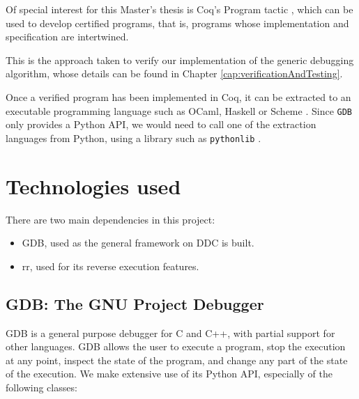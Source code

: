 Of special interest for this Master's thesis is Coq's Program tactic \cite{Program_coq}, which can be used to develop certified programs, that is, programs whose implementation and specification are intertwined.

This is the approach taken to verify our implementation of the generic debugging algorithm, whose details can be found in Chapter \ref{cap:verificationAndTesting}.

Once a verified program has been implemented in Coq, it can be extracted to an executable programming language such as OCaml, Haskell or Scheme \cite{coqExtraction}. Since \verb|GDB| only provides a Python API, we would need to call one of the extraction languages from Python, using a library such as \verb|pythonlib| \cite{ocamlFromPython}.
\section{Technologies used}
There are two main dependencies in this project:
\begin{itemize}
    \item GDB, used as the general framework on DDC is built.
    \item rr, used for its reverse execution features.
\end{itemize}


\subsection{GDB: The GNU Project Debugger}

GDB \cite{gdb} is a general purpose debugger for C and C++, with partial support for other languages. GDB allows the user to execute a program, stop the execution at any point, inspect the state of the program, and change any part of the state of the execution.
%
We make extensive use of its Python API, especially of the following classes:

